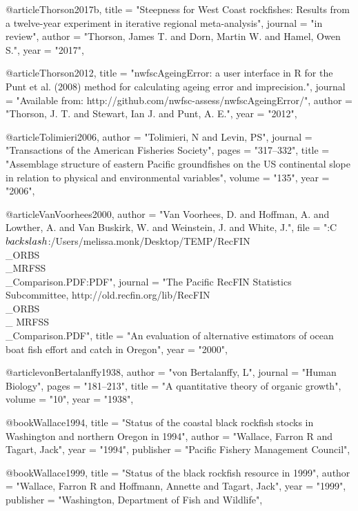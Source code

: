 {@article{Thorson2017b,
    title = "{Steepness for West Coast rockfishes:  Results from a twelve-year experiment in iterative regional meta-analysis}",
    journal = "{in review}",
    author = "{Thorson, James T. and Dorn, Martin W. and Hamel, Owen S.}",
    year = "{2017}",
}

@article{Thorson2012,
    title = "{{nwfscAgeingError}: a user interface in {R} for the {Punt} et al. (2008) method for calculating ageing error and imprecision.}",
    journal = "{Available from: http://github.com/nwfsc-assess/nwfscAgeingError/}",
    author = "{Thorson, J. T. and Stewart, Ian J. and Punt, A. E.}",
    year = "{2012}",
}

@article{Tolimieri2006,
    author = "{Tolimieri, N and Levin, PS}",
    journal = "{Transactions of the American Fisheries Society}",
    pages = "{317--332}",
    title = "{{Assemblage structure of eastern Pacific groundfishes on the US continental slope in relation to physical and environmental variables}}",
    volume = "{135}",
    year = "{2006}",
}

@article{VanVoorhees2000,
    author = "{{Van Voorhees}, D. and Hoffman, A. and Lowther, A. and {Van Buskirk}, W. and Weinstein, J. and White, J.}",
    file = "{:C$\\backslash$:/Users/melissa.monk/Desktop/TEMP/RecFIN\\_ORBS\\_MRFSS\\_Comparison.PDF:PDF}",
    journal = "{The Pacific RecFIN Statistics Subcommittee, http://old.recfin.org/lib/RecFIN\\_ORBS\\_ MRFSS\\_Comparison.PDF}",
    title = "{{An evaluation of alternative estimators of ocean boat fish effort and catch in Oregon}}",
    year = "{2000}",
}

@article{vonBertalanffy1938,
    author = "{von Bertalanffy, L}",
    journal = "{Human Biology}",
    pages = "{181--213}",
    title = "{{A quantitative theory of organic growth}}",
    volume = "{10}",
    year = "{1938}",
}

@book{Wallace1994,
    title = "{Status of the coastal black rockfish stocks in Washington and northern Oregon in 1994}",
    author = "{Wallace, Farron R and Tagart, Jack}",
    year = "{1994}",
    publisher = "{Pacific Fishery Management Council}",
}

@book{Wallace1999,
    title = "{Status of the black rockfish resource in 1999}",
    author = "{Wallace, Farron R and Hoffmann, Annette and Tagart, Jack}",
    year = "{1999}",
    publisher = "{Washington, Department of Fish and Wildlife}",
}

}
